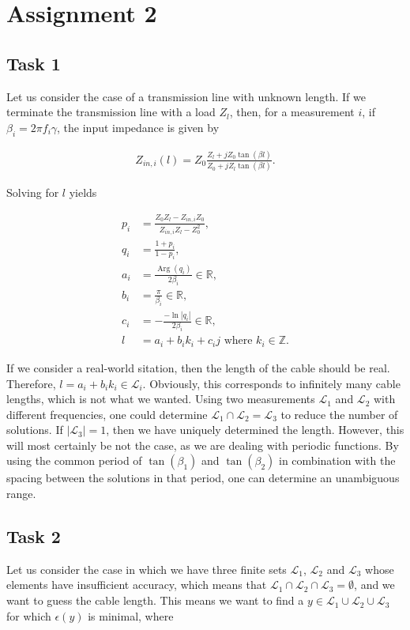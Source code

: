 \documentclass[11pt,titlepage]{report}
\begin{document}
\chapter{Assignment 2}
\section{Task 1}
Let us consider the case of a transmission line with unknown length. If we terminate the transmission line with a load $Z_l$, then, for a measurement $i$, if $\beta_i=2 \pi f_i \gamma$, the input impedance is given by

\begin{align}
	Z_{in,i}(l)=Z_0\frac{Z_l+j Z_0 \tan{(\beta l)}}{Z_0+j Z_l \tan{(\beta l)}}.
\end{align}

Solving for $l$ yields

\begin{align}
	p_i &= \frac{Z_0 Z_l - Z_{in,i} Z_0}{Z_{in,i} Z_l - Z_0^2}, \\
	q_i &= \frac{1+p_i}{1-p_i}, \\
	a_i &= \frac{\operatorname{Arg}(q_i)}{ 2\beta_i} \in \mathbb{R}, \\
	b_i &= \frac{\pi}{\beta_i} \in \mathbb{R}, \\
	c_i &= -\frac{-\operatorname{ln}|q_i|}{2 \beta_i} \in \mathbb{R}, \\
	l &= a_i + b_i k_i + c_i j \text{ where } k_i \in \mathbb{Z}.
\end{align}

If we consider a real-world sitation, then the length of the cable should be real. Therefore, $l=a_i+b_i k_i \in \mathcal{L}_i$. Obviously, this corresponds to infinitely many cable lengths, which is not what we wanted. Using two measurements $\mathcal{L}_1$ and $\mathcal{L}_2$ with different frequencies, one could determine $\mathcal{L}_1 \cap \mathcal{L}_2 = \mathcal{L}_3$ to reduce the number of solutions. If $|\mathcal{L}_3|=1$, then we have uniquely determined the length. However, this will most certainly be not the case, as we are dealing with periodic functions. By using the common period of $\tan{(\beta_1)}$ and $\tan{(\beta_2)}$ in combination with the spacing between the solutions in that period, one can determine an unambiguous range.


\section{Task 2}
Let us consider the case in which we have three finite sets $\mathcal{L}_1$, $\mathcal{L}_2$ and $\mathcal{L}_3$ whose elements have insufficient accuracy, which means that $\mathcal{L}_1 \cap \mathcal{L}_2 \cap \mathcal{L}_3 = \emptyset$, and we want to guess the cable length. This means we want to find a $y \in \mathcal{L}_1 \cup \mathcal{L}_2 \cup \mathcal{L}_3$ for which $\epsilon(y)$ is minimal, where
\end{document}
